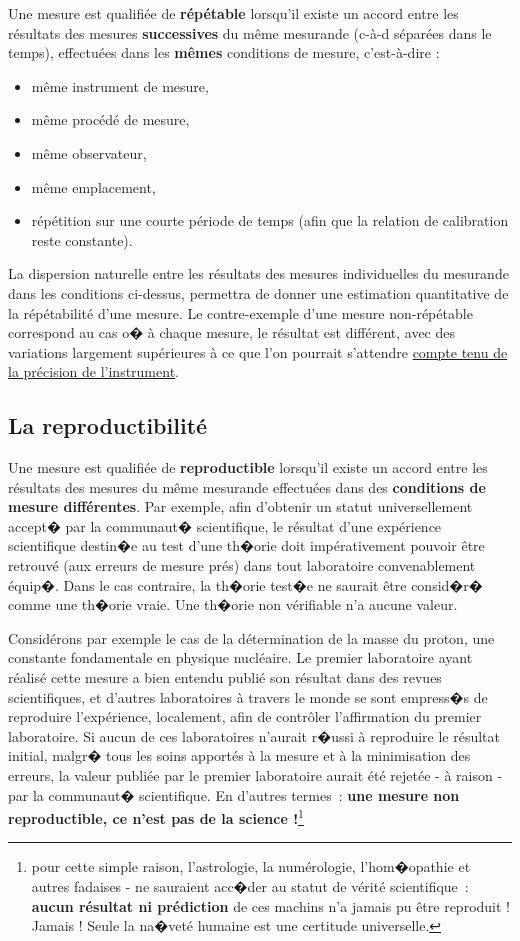 Une mesure est qualifiée de \textbf{répétable} lorsqu'il existe un accord entre les résultats des mesures \textbf{successives} du même mesurande (c-à-d séparées dans le temps), effectuées dans les \textbf{mêmes} conditions de mesure, c'est-à-dire :
\begin{itemize}\itemsep1pt
\renewcommand{\labelitemi}{$\bullet$}
\item même instrument de mesure,
\item même procédé de mesure,
\item même observateur,
\item même emplacement,
\item répétition sur une courte période de temps (afin que la relation de calibration reste constante).
\end{itemize}
La dispersion naturelle entre les résultats des mesures individuelles du mesurande dans les conditions ci-dessus, permettra de donner une estimation quantitative de la répétabilité d'une mesure. Le contre-exemple d'une mesure non-répétable correspond au cas o� à chaque mesure, le résultat est différent, avec des variations largement supérieures à ce que l'on pourrait s'attendre \underline{compte tenu de la précision de l'instrument}.

\subsection{La reproductibilité}

Une mesure est qualifiée de \textbf{reproductible} lorsqu'il existe un accord entre les résultats des mesures du même mesurande effectuées dans des \textbf{conditions de mesure différentes}. Par exemple, afin d'obtenir un statut universellement accept� par la communaut� scientifique, le résultat d'une expérience scientifique destin�e au test d'une th�orie doit impérativement pouvoir être retrouvé (aux erreurs de mesure prés) dans tout laboratoire convenablement équip�. Dans le cas contraire, la th�orie test�e ne saurait être consid�r� comme une th�orie vraie. Une th�orie non vérifiable n'a aucune valeur.

Considérons par exemple le cas de la détermination de la masse du proton, une constante fondamentale en physique nucléaire. Le premier laboratoire ayant réalisé cette mesure a bien entendu publié son résultat dans des revues scientifiques, et d'autres laboratoires à travers le monde se sont empress�s de reproduire l'expérience, localement, afin de contrôler l'affirmation du premier laboratoire. Si aucun de ces laboratoires n'aurait r�ussi à reproduire le résultat initial, malgr� tous les soins apportés à la mesure et à la minimisation des erreurs, la valeur publiée par le premier laboratoire aurait été rejetée - à raison - par la communaut� scientifique. En d'autres termes~: \textbf{une mesure non reproductible, ce n'est pas de la science !}\footnote{pour cette simple raison, l'astrologie, la numérologie, l'hom�opathie et autres fadaises - ne sauraient acc�der au statut de vérité scientifique~: \textbf{aucun résultat ni prédiction} de ces machins n'a jamais pu être reproduit ! Jamais ! Seule la na�veté humaine est une certitude universelle.}

